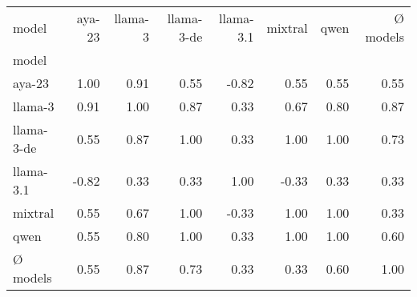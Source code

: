 \begin{tabular}{lrrrrrrr}
\toprule
model & aya-23 & llama-3 & llama-3-de & llama-3.1 & mixtral & qwen & Ø models \\
model &  &  &  &  &  &  &  \\
\midrule
aya-23 & 1.00 & 0.91 & 0.55 & -0.82 & 0.55 & 0.55 & 0.55 \\
llama-3 & 0.91 & 1.00 & 0.87 & 0.33 & 0.67 & 0.80 & 0.87 \\
llama-3-de & 0.55 & 0.87 & 1.00 & 0.33 & 1.00 & 1.00 & 0.73 \\
llama-3.1 & -0.82 & 0.33 & 0.33 & 1.00 & -0.33 & 0.33 & 0.33 \\
mixtral & 0.55 & 0.67 & 1.00 & -0.33 & 1.00 & 1.00 & 0.33 \\
qwen & 0.55 & 0.80 & 1.00 & 0.33 & 1.00 & 1.00 & 0.60 \\
Ø models & 0.55 & 0.87 & 0.73 & 0.33 & 0.33 & 0.60 & 1.00 \\
\bottomrule
\end{tabular}
